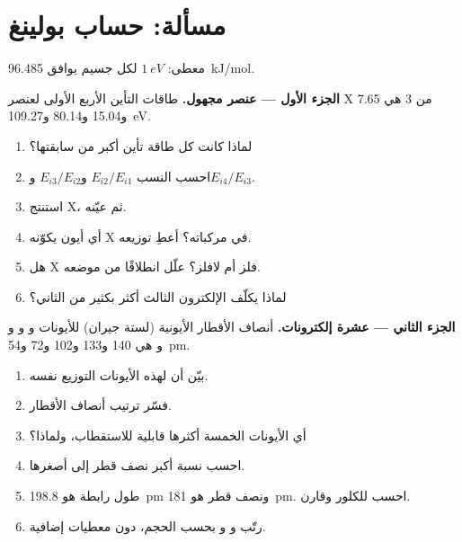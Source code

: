 \section{مسألة: حساب بولينغ}

\begin{problem}
\label{pb:b1:periodicity:1}
معطى: $\qty{1}{eV}$ لكل جسيم يوافق \qty{96.485}{kJ/mol}.

\medskip
\noindent\textbf{الجزء الأول --- عنصر مجهول.}
طاقات التأين الأربع الأولى لعنصر X من  3 هي 7.65
و15.04 و80.14 و\qty{109.27}{eV}.
\begin{enumerate}
  \item لماذا كانت كل طاقة تأين أكبر من سابقتها؟
  \item احسب النسب $E_{i2}/E_{i1}$ و$E_{i3}/E_{i2}$
        و$E_{i4}/E_{i3}$.
  \item استنتج  X، ثم عيّنه.
  \item أي أيون يكوّنه X في مركباته؟ أعطِ توزيعه.
  \item هل X فلز أم لافلز؟ علّل انطلاقًا من موضعه.
  \item لماذا يكلّف الإلكترون الثالث أكثر بكثير من الثاني؟
\end{enumerate}

\medskip
\noindent\textbf{الجزء الثاني --- عشرة إلكترونات.}
أنصاف الأقطار الأيونية (لستة جيران) للأيونات  و و
و و هي 140 و133 و102 و72 و\qty{54}{pm}.
\begin{enumerate}[resume]
  \item بيّن أن لهذه الأيونات التوزيع نفسه.
  \item فسّر ترتيب أنصاف الأقطار.
  \item أي الأيونات الخمسة أكثرها قابلية للاستقطاب، ولماذا؟
  \item احسب نسبة أكبر نصف قطر إلى أصغرها.
  \item طول رابطة  هو \qty{198.8}{pm} ونصف قطر
         هو \qty{181}{pm}. احسب  للكلور
        وقارن.
  \item رتّب  و و بحسب الحجم، دون
        معطيات إضافية.
\end{enumerate}


\end{problem}
